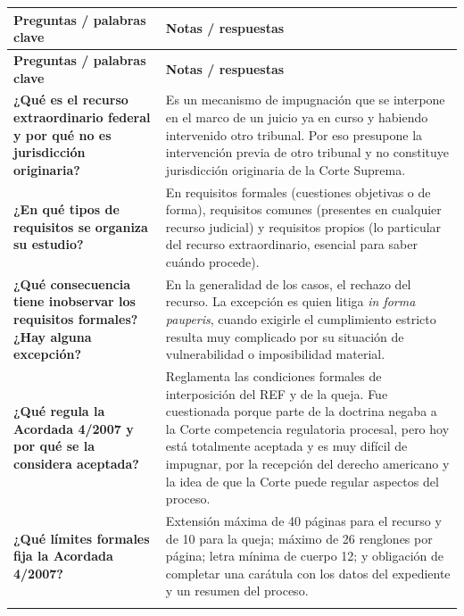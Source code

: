 \documentclass[12pt,oneside]{book}
\begin{document}
\begin{longtable}{@{}>{\raggedright\arraybackslash}p{}>{\raggedright\arraybackslash}p{}@{}}
\toprule
\textbf{Preguntas / palabras clave} & \textbf{Notas / respuestas} \\
\midrule
\endfirsthead
\toprule
\textbf{Preguntas / palabras clave} & \textbf{Notas / respuestas} \\
\midrule
\endhead
\endfoot
\endlastfoot

\textbf{¿Qué es el recurso extraordinario federal y por qué no es jurisdicción originaria?} &
Es un mecanismo de impugnación que se interpone en el marco de un juicio ya en curso y habiendo intervenido otro tribunal. Por eso presupone la intervención previa de otro tribunal y no constituye jurisdicción originaria de la Corte Suprema. \\
\addlinespace[0.6em]

\textbf{¿En qué tipos de requisitos se organiza su estudio?} &
En requisitos formales (cuestiones objetivas o de forma), requisitos comunes (presentes en cualquier recurso judicial) y requisitos propios (lo particular del recurso extraordinario, esencial para saber cuándo procede). \\
\addlinespace[0.6em]

\textbf{¿Qué consecuencia tiene inobservar los requisitos formales? ¿Hay alguna excepción?} &
En la generalidad de los casos, el rechazo del recurso. La excepción es quien litiga \textit{in forma pauperis}, cuando exigirle el cumplimiento estricto resulta muy complicado por su situación de vulnerabilidad o imposibilidad material. \\
\addlinespace[0.6em]

\textbf{¿Qué regula la Acordada 4/2007 y por qué se la considera aceptada?} &
Reglamenta las condiciones formales de interposición del REF y de la queja. Fue cuestionada porque parte de la doctrina negaba a la Corte competencia regulatoria procesal, pero hoy está totalmente aceptada y es muy difícil de impugnar, por la recepción del derecho americano y la idea de que la Corte puede regular aspectos del proceso. \\
\addlinespace[0.6em]

\textbf{¿Qué límites formales fija la Acordada 4/2007?} &
Extensión máxima de 40 páginas para el recurso y de 10 para la queja; máximo de 26 renglones por página; letra mínima de cuerpo 12; y obligación de completar una carátula con los datos del expediente y un resumen del proceso. \\
\addlinespace[0.6em]


\end{longtable}
\end{document}

